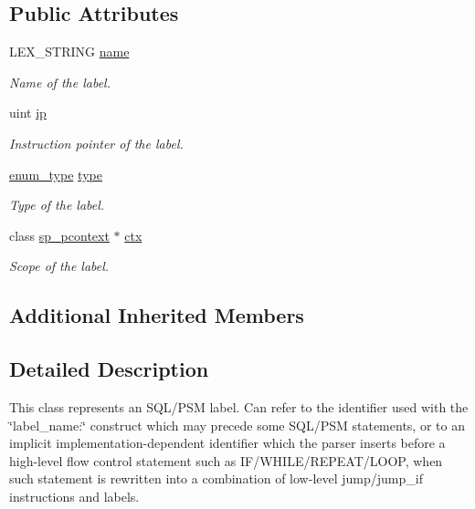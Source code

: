 \subsection*{Public Attributes}
\begin{DoxyCompactItemize}
\item 
\mbox{\label{classsp__label_aa35f310b25d94d7f5cd6264d4376e07f}} 
L\+E\+X\+\_\+\+S\+T\+R\+I\+NG \mbox{\hyperlink{classsp__label_aa35f310b25d94d7f5cd6264d4376e07f}{name}}
\begin{DoxyCompactList}\small\item\em Name of the label. \end{DoxyCompactList}\item 
\mbox{\label{classsp__label_ad954c514391149e31d08638c05f24cdb}} 
uint \mbox{\hyperlink{classsp__label_ad954c514391149e31d08638c05f24cdb}{ip}}
\begin{DoxyCompactList}\small\item\em Instruction pointer of the label. \end{DoxyCompactList}\item 
\mbox{\label{classsp__label_aa861c2f6010e1aad64aa8faf13be403c}} 
\mbox{\hyperlink{classsp__label_af128ff1711a8107a6b4a073e547f52d9}{enum\+\_\+type}} \mbox{\hyperlink{classsp__label_aa861c2f6010e1aad64aa8faf13be403c}{type}}
\begin{DoxyCompactList}\small\item\em Type of the label. \end{DoxyCompactList}\item 
\mbox{\label{classsp__label_abd7c65dec8d91547fea229c699786144}} 
class \mbox{\hyperlink{classsp__pcontext}{sp\+\_\+pcontext}} $\ast$ \mbox{\hyperlink{classsp__label_abd7c65dec8d91547fea229c699786144}{ctx}}
\begin{DoxyCompactList}\small\item\em Scope of the label. \end{DoxyCompactList}\end{DoxyCompactItemize}
\subsection*{Additional Inherited Members}


\subsection{Detailed Description}
This class represents an S\+Q\+L/\+P\+SM label. Can refer to the identifier used with the \char`\"{}label\+\_\+name\+:\char`\"{} construct which may precede some S\+Q\+L/\+P\+SM statements, or to an implicit implementation-\/dependent identifier which the parser inserts before a high-\/level flow control statement such as I\+F/\+W\+H\+I\+L\+E/\+R\+E\+P\+E\+A\+T/\+L\+O\+OP, when such statement is rewritten into a combination of low-\/level jump/jump\+\_\+if instructions and labels. 

